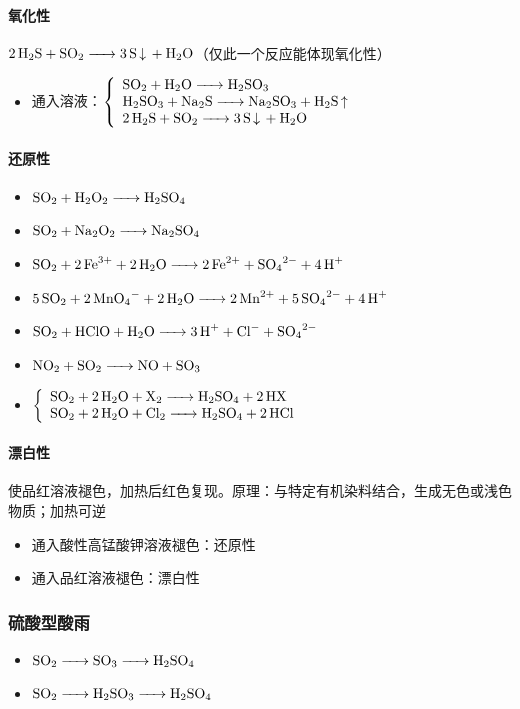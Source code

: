 \documentclass[a4paper]{article}
\begin{document}
	\paragraph{氧化性}
	$\ce{2H2S + SO2 -> 3S v + H2O}$（仅此一个反应能体现氧化性）
	\begin{itemize}
		\item {}通入溶液：$\left\{\begin{array}{lr}
				\ce{SO2 + H2O -> H2SO3}\\
				\ce{H2SO3 + Na2S -> Na2SO3 + H2S ^}\\
				\ce{2H2S + SO2 -> 3S v + H2O}\\
			\end{array}\right.$
	\end{itemize}
	\paragraph{还原性}
	\begin{itemize}
		\item $\ce{SO2 + H2O2 -> H2SO4}$
		\item $\ce{SO2 + Na2O2 -> Na2SO4}$
		\item $\ce{SO2 + 2Fe^3+ + 2H2O -> 2Fe^2+ + SO4^2- + 4H+}$
		\item $\ce{5SO2 + 2MnO4- + 2H2O -> 2Mn^2+ + 5SO4^2- + 4H+}$
		\item $\ce{SO2 + HClO + H2O -> 3H+ + Cl- + SO4^2-}$
		\item $\ce{NO2 + SO2 -> NO + SO3}$
		\item $\left\{\begin{array}{lr}
				\ce{SO2 + 2H2O + X2 -> H2SO4 + 2HX}\\
				\ce{SO2 + 2H2O + Cl2 -> H2SO4 + 2HCl}\\
			\end{array}\right.$
	\end{itemize}
	\paragraph{漂白性}
	使\textcolor[rgb]{0.721,0.207,0.105}{品红溶液}褪色，加热后红色复现。原理：与特定有机染料结合，生成无色或浅色物质；加热可逆
	\begin{itemize}
		\item {}通入酸性高锰酸钾溶液褪色：还原性
		\item {}通入品红溶液褪色：漂白性
	\end{itemize}
	\subsubsection{硫酸型酸雨}
	\begin{itemize}
		\item $\ce{SO2 -> SO3 -> H2SO4}$
		\item $\ce{SO2 -> H2SO3 -> H2SO4}$
	\end{itemize}
\end{document}

